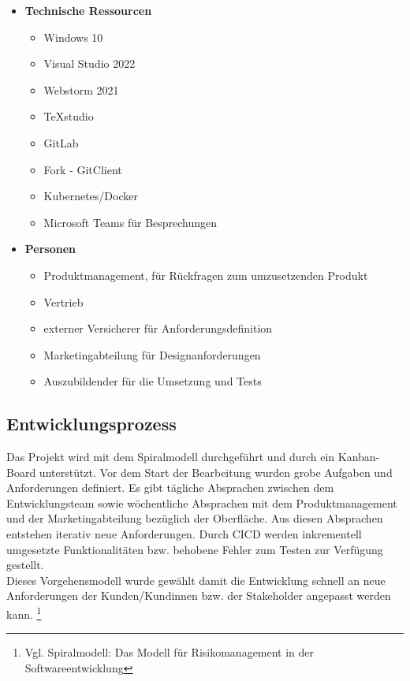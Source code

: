 \begin{itemize}
	\item \textbf{Technische Ressourcen}
	\begin{itemize}
		\item Windows 10
		\item Visual Studio 2022
		\item Webstorm 2021
		\item TeXstudio
		\item GitLab
		\item Fork - GitClient
		\item Kubernetes/Docker
		\item Microsoft Teams für Besprechungen
	\end{itemize}
	\item \textbf{Personen}
	\begin{itemize}
	 	\item Produktmanagement, für Rückfragen zum umzusetzenden Produkt
	 	\item Vertrieb
	 	\item externer Versicherer für Anforderungsdefinition
		\item Marketingabteilung für Designanforderungen
		\item Auszubildender für die Umsetzung und Tests
	\end{itemize}
\end{itemize}

\subsection{Entwicklungsprozess}
\label{entwicklungsprozess}
Das Projekt wird mit dem Spiralmodell durchgeführt und durch ein Kanban-Board unterstützt. Vor dem Start der Bearbeitung wurden grobe Aufgaben und Anforderungen definiert. Es gibt tägliche Absprachen zwischen dem Entwicklungsteam sowie wöchentliche Absprachen mit dem Produktmanagement und der Marketingabteilung bezüglich der Oberfläche. Aus diesen Absprachen entstehen iterativ neue Anforderungen. Durch \ac{CICD} werden inkrementell umgesetzte Funktionalitäten bzw. behobene Fehler zum Testen zur Verfügung gestellt. \\
Dieses Vorgehensmodell wurde gewählt damit die Entwicklung schnell an neue Anforderungen der Kunden/Kundinnen bzw. der Stakeholder angepasst werden kann. \footnote{Vgl.\cite{Spiralmodell19} Spiralmodell: Das Modell für Risikomanagement in der Softwareentwicklung}
